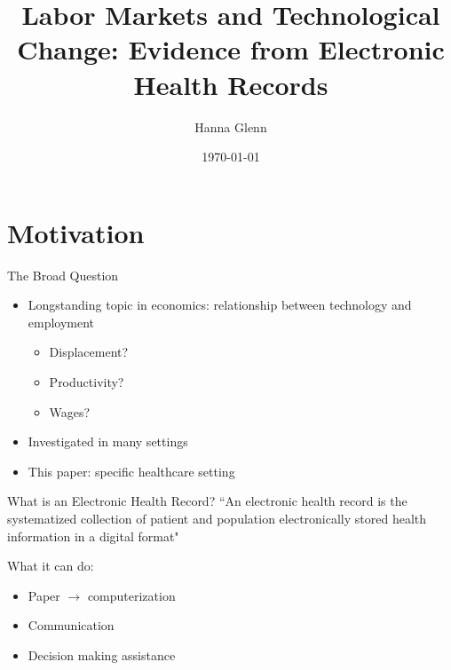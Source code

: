 \documentclass[10pt]{beamer}
\title{Labor Markets and Technological Change: Evidence from Electronic Health Records}
\subtitle{Hanna Glenn}
\date{\today}
\begin{document}
\maketitle




\section[Motivation]{Motivation}

\begin{frame}{The Broad Question}
\begin{itemize}
    \item Longstanding topic in economics: relationship between technology and employment
    \vspace{2mm}
    \begin{itemize}
        \item Displacement?
        \item Productivity?
        \item Wages?
    \end{itemize}
    \vspace{3mm}
    \item Investigated in many settings
    \vspace{3mm}
    \item This paper: specific healthcare setting
\end{itemize}

\end{frame}

\begin{frame}[fragile]{What is an Electronic Health Record?}
``An electronic health record is the systematized collection of patient and population electronically stored health information in a digital format"

\vspace{3mm}

What it can do:
\begin{itemize}
    \item Paper $\rightarrow$ computerization
    \item Communication
    \item Decision making assistance
\end{itemize}

\end{frame}
\end{document}
